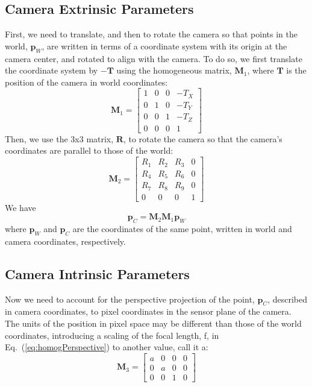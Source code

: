 \subsection{Camera Extrinsic Parameters}
First, we need to translate, and then to rotate the camera so that points in the world, $\mathbf{p}_W$, are written in terms of a coordinate system with its origin at the camera center, and rotated to align with the camera.  To do so, we first translate the coordinate system by $-\mathbf{T}$ using the homogeneous matrix, $\mathbf{M}_1$, where $\mathbf{T}$ is the position of the camera in world coordinates:
\begin{equation}
\mathbf{M}_1 =         \left [
    \begin{array}{cccc}
    1 & 0 & 0 & -T_X \\
    0 & 1 & 0 & -T_Y \\
    0 & 0 & 1 & -T_Z \\
    0 & 0 & 0 & 1
    \end{array}
    \right ]
\end{equation}
Then, we use the 3x3 matrix, $\mathbf{R}$, to rotate the camera so that the camera's coordinates are parallel to those of the world:
\begin{equation}
\mathbf{M}_2 =         \left [
    \begin{array}{cccc}
    R_1 & R_2 & R_3  & 0 \\
    R_4 & R_5 & R_6 & 0 \\
    R_7 & R_8 & R_9 & 0 \\
    0 & 0 & 0 & 1
    \end{array}
    \right ]
    \label{eq:homographyRotation}
\end{equation}
We have
\begin{equation}
\mathbf{p}_C = \mathbf{M}_2 \mathbf{M}_1 \mathbf{p}_W
\label{eq:extrinsic}
\end{equation}
where $\mathbf{p}_W$ and $\mathbf{p}_C$ are the coordinates of the same point, written in world and camera  coordinates, respectively.


\subsection{Camera Intrinsic Parameters}
Now we need to account for the perspective projection of the point, $\mathbf{p}_C$, described in camera coordinates, to pixel coordinates in the sensor plane of the camera.  The units of the position in pixel space may be different than those of the world coordinates, introducing a scaling of the focal length, f, in Eq.~(\ref{eq:homogPerspective}) to another value, call it a:
\begin{equation}
    \mathbf{M}_3 =             \left [
    \begin{array}{cccc}
    a & 0 & 0 & 0 \\
    0 & a & 0 & 0 \\
    0 & 0 & 1 & 0
    \end{array}
    \right ]
    \label{eq:intrinsic}
\end{equation}

